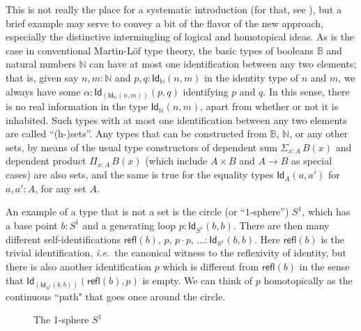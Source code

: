 \documentclass[11pt]{article}
\newcommand{\B}{\ensuremath{\mathbb{B}}}
\newcommand{\N}{\ensuremath{\mathbb{N}}}
\newcommand{\Id}{\mathsf{Id}}
\newcommand{\id}[1]{\Id_{#1}}
\newcommand{\refl}{\mathsf{refl}}
\theoremstyle{remark}
\theoremstyle{definition}
\begin{document}
This is not really the place for a systematic introduction (for that, see \cite{HoTTbook}),  
but a brief example may serve to convey a bit of the flavor of the new approach, especially the
distinctive intermingling of logical and homotopical ideas.  As is the case in conventional Martin-L\"of type theory,
the basic types of booleans $\B$ and natural numbers $\N$ can have at most one identification between any two elements;
that is, given say $n, m : \N$ and $p,q: \id{\N}(n,m)$ in the identity type of $n$ and $m$, we always have some
$\alpha:\id{\left(\id{\N}(n,m)\right)}(p,q)$ identifying $p$ and $q$.  In this sense, there is no real information in
the type $\id{\N}(n,m)$, apart from whether or not it is inhabited.  Such types with at most one identification between
any two elements are called ``(h-)sets''.  Any types that can be constructed from $\B$,
$\N$, or any other sets, by means of the usual type constructors of dependent sum $\Sigma_{x:A}\,B(x)$ and dependent
product $\Pi_{x:A}\,B(x)$ (which include $A\times B$ and $A\rightarrow B$ as special cases) are also sets, and the same
is true for the equality types $\id{A}(a,a')$ for $a,a':A$, for any set $A$.

An example of a type that is not a set is the circle (or ``$1$-sphere'') $S^1$, which has a base point $b: S^1$ and a
generating loop $ p :\id{S^1}(b,b)$.  There are then many different self-identifications
$\refl(b),\, p,\, p\cdot p,\, ... :\id{S^1}(b,b)$.  Here $\refl(b)$ is the trivial identification, \textit{i.e.}\ the
canonical witness to the reflexivity of identity, but there is also another identification $p$ which is different from
$\refl(b)$ in the sense that $\id{\left(\id{S^1}(b,b)\right)}(\refl(b), p)$ is empty.  We can think of $p$ homotopically
as the continuous ``path" that goes once around the circle.

\begin{figure}\centering
\caption{The 1-sphere $S^1$}\label{fig:s1}
\end{figure}
\end{document}
